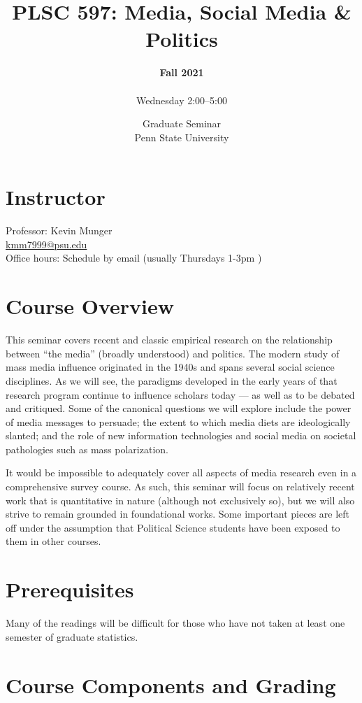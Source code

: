 \vspace{-.1in}\documentclass[11pt]{article}
\title{\bf PLSC 597: Media, Social Media \& Politics}
\author{{\bf \Large Fall 2021} \\ \\ Wednesday 2:00--5:00}
\date{Graduate Seminar\\ Penn State University}
\begin{document}
\maketitle

\section*{Instructor}

\noindent Professor: Kevin Munger\\
 \url{kmm7999@psu.edu}\\
Office hours: Schedule by email (usually Thursdays 1-3pm )

\section*{Course Overview}

This seminar covers recent and classic empirical research on the relationship between ``the media'' (broadly understood) and politics. The modern study of mass media influence originated in the 1940s and spans several social science disciplines. As we will see, the paradigms developed in the early years of that research program continue to influence scholars today --- as well as to be debated and critiqued. Some of the canonical questions we will explore include the power of media messages to persuade; the extent to which media diets are ideologically slanted; and the role of new information technologies and social media on societal pathologies such as mass polarization.

It would be impossible to adequately cover all aspects of media research even in a comprehensive survey course. As such, this seminar will focus on relatively recent work that is quantitative in nature (although not exclusively so), but we will also strive to remain grounded in foundational works. Some important pieces are left off under the assumption that Political Science students have been exposed to them in other courses.



\section*{Prerequisites}

Many of the readings will be difficult for those who have not taken at least one semester of graduate statistics. 

\section*{Course Components and Grading}
\end{document}
